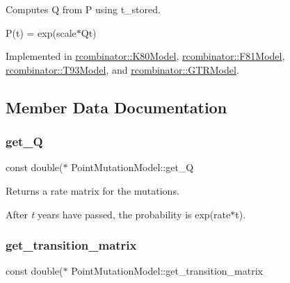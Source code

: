 Computes Q from P using t\+\_\+stored. 

P(t) = exp(scale$\ast$\+Qt) 

Implemented in \mbox{\hyperlink{classrcombinator_1_1K80Model_a70f669e2a31d34a37b19fd185219a9ce}{rcombinator\+::\+K80\+Model}}, \mbox{\hyperlink{classrcombinator_1_1F81Model_a5bb9c63e55c4f8f7b9573281ff6ee610}{rcombinator\+::\+F81\+Model}}, \mbox{\hyperlink{classrcombinator_1_1T93Model_aaa8c96927a1ff3b8c611f0d0f9d6f36a}{rcombinator\+::\+T93\+Model}}, and \mbox{\hyperlink{classrcombinator_1_1GTRModel_a7d71f990fd33bcb7fc6a74accf03d7ae}{rcombinator\+::\+G\+T\+R\+Model}}.



\subsection{Member Data Documentation}
\mbox{\label{classrcombinator_1_1PointMutationModel_a6c6e94bfbf16c3893068e3db1597e941}} 
\subsubsection{\texorpdfstring{get\+\_\+Q}{get\_Q}}
{\footnotesize\ttfamily const double($\ast$ Point\+Mutation\+Model\+::get\+\_\+Q}



Returns a rate matrix for the mutations. 

After {\itshape t} years have passed, the probability is exp(rate$\ast$t). \mbox{\label{classrcombinator_1_1PointMutationModel_a5f17e2f93b22723721a4d04ac2c77aaa}} 
\subsubsection{\texorpdfstring{get\+\_\+transition\+\_\+matrix}{get\_transition\_matrix}}
{\footnotesize\ttfamily const double($\ast$ Point\+Mutation\+Model\+::get\+\_\+transition\+\_\+matrix}



